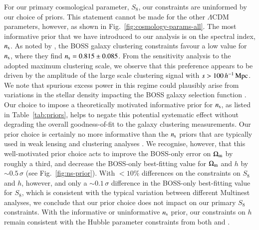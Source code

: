 For our primary cosmological parameter, $S_8$, our constraints are uninformed by our choice of priors.    This statement cannot be made for the other $\Lambda$CDM parameters, however, as shown in Fig.~\ref{fig:cosmology-params-all}.   The most informative prior that we have introduced to our \tttp analysis is on the spectral index, $n_{\rm s}$.  As noted by \citet{troester/etal:2020}, the BOSS galaxy clustering constraints favour a low value for $n_{\rm s}$, where they find $n_{\rm s} = 0.815 \pm 0.085$. 
From the \citet{troester/etal:2020} sensitivity analysis to the adopted maximum clustering scale, we observe that this preference appears to be driven by the amplitude of the large scale clustering signal with $s > 100 \, h^{-1}\, {\rm Mpc}$.  We note that spurious excess power in this regime could plausibly arise from variations in the stellar density impacting the BOSS galaxy selection function \citep{ross/etal:2017}.  Our choice to impose a theoretically motivated informative prior for $n_{\rm s}$, as listed in Table~\ref{tab:priors}, helps to negate this potential systematic effect without degrading the overall goodness-of-fit to the galaxy clustering measurements.  Our prior choice is certainly no more informative than the $n_{\rm s}$ priors that are typically used in weak lensing and clustering analyses \citep[see for example][]{abbott/etal:2018,eBOSS/etal:2020}. 
We recognise, however, that this well-motivated prior choice acts to improve the BOSS-only error on $\Omega_{\rm m}$ by roughly a third, and decrease the BOSS-only best-fitting value for $\Omega_{\rm m}$ and $h$ by $\sim\! 0.5\,\sigma$ (see Fig.~\ref{fig:ns-prior}).  With $<10\%$ differences on the constraints on $S_8$ and $h$, however, and only a $\sim\! 0.1\,\sigma$ difference in the BOSS-only best-fitting value for $S_8$, which is consistent with the typical variation between different {\sc Multinest} analyses, we conclude that our prior choice does not impact on our primary $S_8$ constraints.   With the informative or uninformative $n_{\rm s}$ prior, our constraints on $h$ remain consistent with the Hubble parameter constraints from both \citet{planck/etal:2018} and \citet{riess/etal:2019}.

